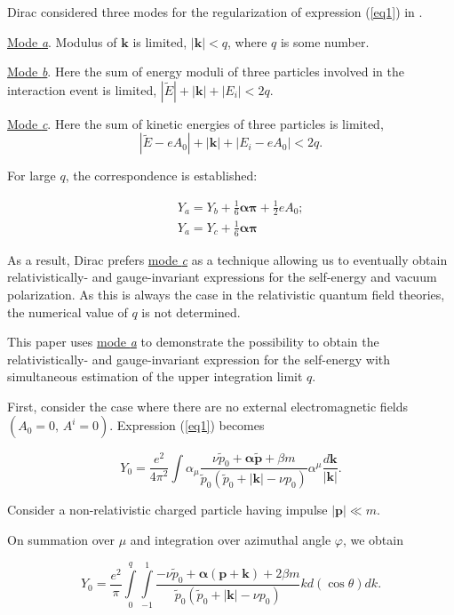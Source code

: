 \documentclass[a4paper,draft,showpacs,preprint,prd,aps]{revtex4}
\begin{document}
Dirac considered three modes for the regularization of expression
(\ref{eq1})
in \cite{ref1}.

\underline{Mode {\it a}}.
Modulus of $\bm{k}$ is limited, $|{\bm k}|<q$, where $q$ is some number.

\underline{Mode {\it b}}.
Here the sum of energy moduli of three particles involved in the interaction
event
is limited, $|\tilde{E}| + |{\bm k}| + |E_i| < 2q$.

\underline {Mode {\it c}}.
Here the sum of kinetic energies of three particles is limited,
\[
|\tilde{E} - eA_0| + |{\bm k}| + |E_i- eA_0| < 2q.
\]

For large $q$, the correspondence is established:

\begin{eqnarray}
\label{eq3}
&&Y_a = Y_{b} + \frac 16 \bm{\alpha}\bm{\pi} + \frac 12 eA_0; \nonumber\\
&&Y_a = Y_{c} + \frac 16 \bm{\alpha}\bm{\pi}
\end{eqnarray}

As a result, Dirac prefers \underline{mode {\it c}} as a technique
allowing us to eventually obtain relativistically- and
gauge-invariant expressions for the self-energy and vacuum polarization. As
this is always the case in the relativistic quantum field theories, the
numerical value of $q$ is not determined.

This paper uses \underline {mode {\it a}} to
demonstrate the possibility to obtain the relativistically- and
gauge-invariant expression for the self-energy with simultaneous estimation
of the upper integration limit $q$.

First, consider the case where there are no external electromagnetic fields
$(A_0 = 0,\,A^i = 0)$. Expression (\ref{eq1}) becomes

\begin{equation}
\label{eq4}
Y_0 = \frac{e^2}{4\pi^2}\int \alpha _\mu
\frac{\nu\tilde{p}_0 + {\bm \alpha} \bm{\tilde{p}} + \beta  m}
{\tilde{p}_0(\tilde {p}_0 + |{\bm k}| - \nu p_0 )}
\alpha^\mu \frac{d{\bm k}}{|{\bm k}|}.
\end{equation}

Consider a non-relativistic charged particle having impulse $|\bm{p}| \ll
m$.

On summation over $\mu $ and integration over azimuthal angle $\varphi $, we
obtain

\begin{equation}
\label{eq5}
Y_0 = \frac{e^2}\pi\int\limits_0^q \int\limits_{-1}^1
\frac
{-\nu\tilde{p}_0 + {\bm \alpha}(\bm{p} + \bm{k}) + 2\beta m}
{\tilde{p}_0 (\tilde{p}_0 + |{\bm k}| - \nu p_0)}
k d(\cos\theta)dk.
\end{equation}
\end{document}
